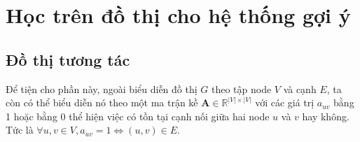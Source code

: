


    

\section{Học trên đồ thị cho hệ thống gợi ý} \label{3.2-graph-learning-recommender}
\subsection{Đồ thị tương tác}
\noindent Để tiện cho phần này, ngoài biểu diễn đồ thị $G$ theo tập node $V$ và cạnh $E$, ta còn có thể biểu diễn nó theo một ma trận kề $\mathbf{A} \in \mathbb{R}^{|V| \times |V|}$ với các giá trị $a_{uv}$ bằng 1 hoặc bằng 0 thể hiện việc có tồn tại cạnh nối giữa hai node $u$ và $v$ hay không. Tức là $\forall u, v \in V, a_{uv} = 1 \Leftrightarrow (u, v) \in E$.

